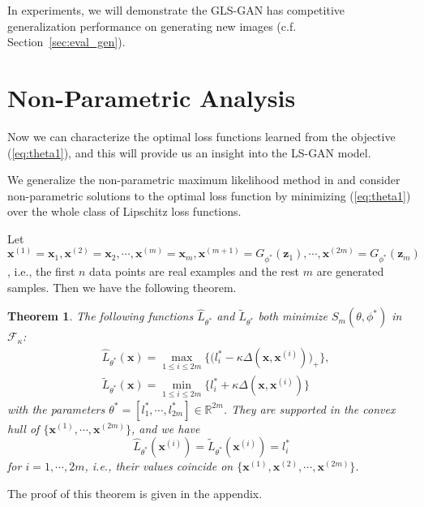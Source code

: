 \documentclass[11pt,fullpage, letterpaper,twoside]{article}
\newtheorem{theorem}{Theorem}
\newcommand{\1}[1]{\mathds{1}_{\left[#1\right]}}
\begin{document}
In experiments, we will demonstrate the GLS-GAN has competitive generalization performance on generating new images (c.f. Section~\ref{sec:eval_gen}).











\section{Non-Parametric Analysis}\label{sec:nonparam}
Now we can characterize the optimal loss functions learned from the objective (\ref{eq:theta1}), and this will provide us an insight into the LS-GAN model.

We generalize the non-parametric maximum likelihood method in \cite{carando2009nonparametric} and consider non-parametric solutions to the optimal loss function by minimizing (\ref{eq:theta1}) over the whole class of Lipschitz loss functions.




Let $\mathbf x^{(1)}=\mathbf x_1, \mathbf x^{(2)}=\mathbf x_2, \cdots,\mathbf x^{(m)}=\mathbf x_m, \mathbf x^{(m+1)}=G_{\phi^*}(\mathbf z_1),\cdots,\mathbf x^{(2m)}=G_{\phi^*}(\mathbf z_m)$, i.e., the first $n$ data points are real examples and the rest $m$ are generated samples.  Then we have the following theorem.
\begin{theorem}\label{thm_nonparam}
The following functions $\widehat L_{\theta^*}$ and $\widetilde L_{\theta^*}$ both minimize $S_{m}(\theta,\phi^*)$ in $\mathcal F_\kappa$:
\begin{equation}\label{eq:param}
\begin{aligned}
&\widehat L_{\theta^*}(\mathbf x) = \max_{1\leq i\leq 2m}\big\{\big(l_i^*-\kappa\Delta(\mathbf x,\mathbf x^{(i)})\big)_+\big\}, \\
&\widetilde L_{\theta^*}(\mathbf x) = \min_{1\leq i\leq 2m}\big\{l_i^*+\kappa\Delta(\mathbf x,\mathbf x^{(i)})\}
\end{aligned}
\end{equation}
with the parameters $\theta^*=[l_1^*,\cdots,l_{2m}^*]\in\mathbb R^{2m}$. They are supported in the convex hull of $\{\mathbf x^{(1)}, \cdots, \mathbf x^{(2m)}\}$, and we have
$$\widehat L_{\theta^*}(\mathbf x^{(i)})=\widetilde L_{\theta^*}(\mathbf x^{(i)})=l_i^*$$
for $i=1,\cdots,2m$, i.e., their values coincide on $\{\mathbf x^{(1)},\mathbf x^{(2)},\cdots,\mathbf x^{(2m)}\}$.
\end{theorem}
The proof of this theorem is given in the appendix.
\end{document}
